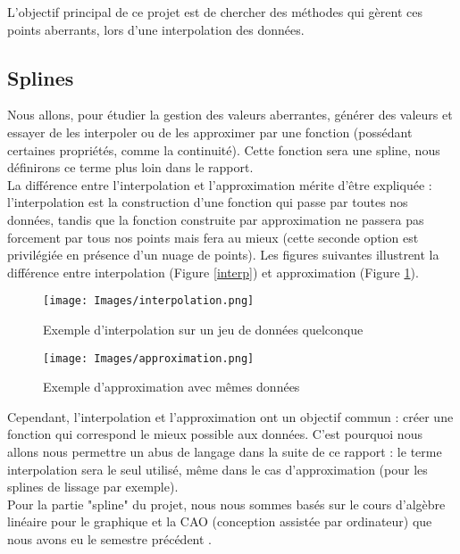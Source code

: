 \documentclass[a4paper,12pt]{article} %
\begin{document}
        L'objectif principal de ce projet est de chercher des méthodes qui gèrent ces points aberrants, lors d'une interpolation des données.
		\subsection{Splines}
		    Nous allons, pour étudier la gestion des valeurs aberrantes, générer des valeurs et essayer de les interpoler ou de les approximer par une fonction (possédant certaines propriétés, comme la continuité). Cette fonction sera une spline, nous définirons ce terme plus loin dans le rapport.\\
		    
			 La différence entre l'interpolation et l'approximation mérite d'être expliquée : l'interpolation est la construction d'une fonction qui passe par toutes nos données, tandis que la fonction construite par approximation ne passera pas forcement par tous nos points mais fera au mieux (cette seconde option est privilégiée en présence d'un nuage de points). Les figures suivantes illustrent la différence entre interpolation (Figure \ref{interp}) et approximation (Figure \ref{approx}).
			 
			  \begin{figure}[H]
                    \centering
                     \texttt{[image: Images/interpolation.png]}
                    \caption{\label{interp}Exemple d'interpolation sur un jeu de données quelconque}
                   \endminipage
                   \hfill
                    \endminipage
                     \texttt{[image: Images/approximation.png]}
                    \caption{\label{approx}Exemple d'approximation avec mêmes données}
                    \endminipage
                \end{figure}
			 
			 Cependant, l'interpolation et l'approximation ont un objectif commun : créer une fonction qui correspond le mieux possible aux données. C'est pourquoi nous allons nous permettre un abus de langage dans la suite de ce rapport : le terme interpolation sera le seul utilisé, même dans le cas d'approximation (pour les splines de lissage par exemple).\\
			 
			 Pour la partie "spline" du projet, nous nous sommes basés sur le cours d'algèbre linéaire pour le graphique et la CAO (conception assistée par ordinateur) que nous avons eu le semestre précédent \cite{CAO_site}.
			 
\end{document}
